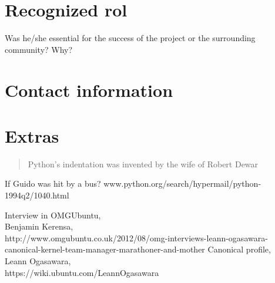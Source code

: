 \documentclass[11pt]{scrartcl}
\begin{document}
\section{Recognized rol}

Was he/she essential for the success of the project or the surrounding community? Why?



\section{Contact information}

\section{Extras}

\begin{quote}Python's indentation was invented by the wife of Robert Dewar\end{quote}

If Guido was hit by a bus? www.python.org/search/hypermail/python-1994q2/1040.html

\begin{thebibliography}{9}

      Interview in OMGUbuntu,\\
      Benjamin Kerensa,\\
      http://www.omgubuntu.co.uk/2012/08/omg-interviews-leann-ogasawara-canonical-kernel-team-manager-marathoner-and-mother
    Canonical profile,\\
    Leann Ogasawara,\\
    https://wiki.ubuntu.com/LeannOgasawara

\end{thebibliography}
\end{document}
